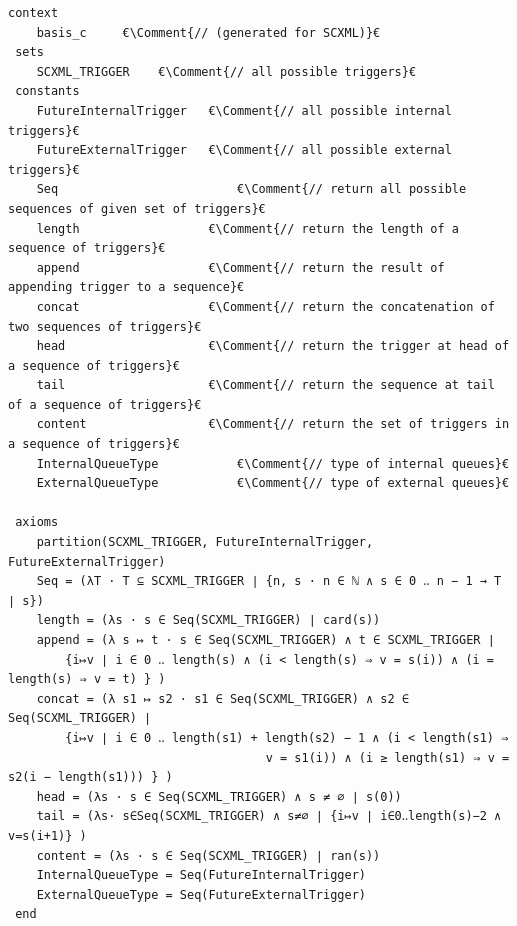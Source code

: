  \begin{lstlisting}[caption={Abstract basis context},label={lst:BasisContext}, language=Event-B, tabsize=8, escapechar=€, frame=single, basicstyle=\rmfamily\scriptsize, belowskip=-2.0 \baselineskip, float=t]
 context
 	basis_c 	€\Comment{// (generated for SCXML)}€
 sets
 	SCXML_TRIGGER	 €\Comment{// all possible triggers}€
 constants
 	FutureInternalTrigger	€\Comment{// all possible internal triggers}€
 	FutureExternalTrigger	€\Comment{// all possible external triggers}€
 	Seq							€\Comment{// return all possible sequences of given set of triggers}€
 	length					€\Comment{// return the length of a sequence of triggers}€
 	append					€\Comment{// return the result of appending trigger to a sequence}€
 	concat					€\Comment{// return the concatenation of two sequences of triggers}€
 	head					€\Comment{// return the trigger at head of a sequence of triggers}€
 	tail					€\Comment{// return the sequence at tail of a sequence of triggers}€
 	content					€\Comment{// return the set of triggers in a sequence of triggers}€
 	InternalQueueType			€\Comment{// type of internal queues}€
 	ExternalQueueType			€\Comment{// type of external queues}€
 	
 axioms
 	partition(SCXML_TRIGGER, FutureInternalTrigger, FutureExternalTrigger) 
 	Seq = (λT · T ⊆ SCXML_TRIGGER ∣ {n, s · n ∈ ℕ ∧ s ∈ 0 ‥ n − 1 → T ∣ s})
 	length = (λs · s ∈ Seq(SCXML_TRIGGER) ∣ card(s))
 	append = (λ s ↦ t · s ∈ Seq(SCXML_TRIGGER) ∧ t ∈ SCXML_TRIGGER ∣ 
 		{i↦v ∣ i ∈ 0 ‥ length(s) ∧ (i < length(s) ⇒ v = s(i)) ∧ (i = length(s) ⇒ v = t) } )
	concat = (λ s1 ↦ s2 · s1 ∈ Seq(SCXML_TRIGGER) ∧ s2 ∈ Seq(SCXML_TRIGGER) ∣ 
		{i↦v ∣ i ∈ 0 ‥ length(s1) + length(s2) − 1 ∧ (i < length(s1) ⇒ 
									v = s1(i)) ∧ (i ≥ length(s1) ⇒ v = s2(i − length(s1))) } )
	head = (λs · s ∈ Seq(SCXML_TRIGGER) ∧ s ≠ ∅ ∣ s(0))								
	tail = (λs· s∈Seq(SCXML_TRIGGER) ∧ s≠∅ ∣ {i↦v ∣ i∈0‥length(s)−2 ∧ v=s(i+1)} )	
	content = (λs · s ∈ Seq(SCXML_TRIGGER) ∣ ran(s))
	InternalQueueType = Seq(FutureInternalTrigger)
	ExternalQueueType = Seq(FutureExternalTrigger)
 end
 \end{lstlisting}	

